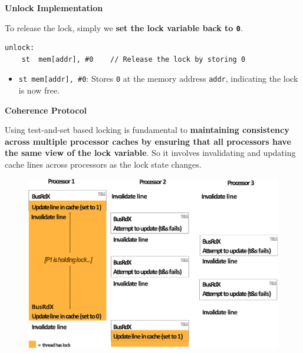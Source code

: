\highspace
\begin{flushleft}
    \textcolor{Green3}{ \textbf{Unlock Implementation}}
\end{flushleft}
To release the lock, simply we \textbf{set the lock variable back to \texttt{0}}.
\begin{lstlisting}
unlock: 
    st  mem[addr], #0    // Release the lock by storing 0
\end{lstlisting}
\begin{itemize}
    \item \texttt{st mem[addr], \#0}: Stores \texttt{0} at the memory address \texttt{addr}, indicating the lock is now free.
\end{itemize}

\newpage

\begin{flushleft}
    \textcolor{Red2}{ \textbf{Coherence Protocol}}
\end{flushleft}
Using test-and-set based locking is fundamental to \textbf{maintaining consistency across multiple processor caches by ensuring that all processors have the same view of the lock variable}. So it involves invalidating and updating cache lines across processors as the lock state changes.
\begin{figure}[!htp]
    \centering
    \includegraphics[width=\textwidth]{img/test-and-set-1.pdf}
\end{figure}
